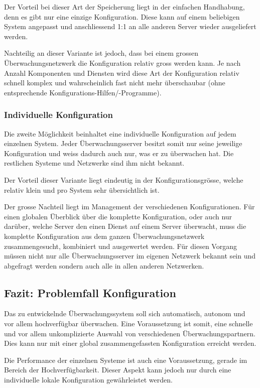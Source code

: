 Der Vorteil bei dieser Art der Speicherung liegt in der einfachen Handhabung, denn es gibt nur eine einzige Konfiguration. Diese kann auf einem beliebigen System angepasst und anschliessend 1:1 an alle anderen Server wieder ausgeliefert werden.

Nachteilig an dieser Variante ist jedoch, dass bei einem grossen \"Uberwachungsnetzwerk die Konfiguration relativ gross werden kann. Je nach Anzahl Komponenten und Diensten wird diese Art der Konfiguration relativ schnell komplex und wahrscheinlich fast nicht mehr \"uberschaubar (ohne entsprechende Konfigurations-Hilfen/-Programme).

\subsubsection{Individuelle Konfiguration} \label{sec:theorie-config-variants-individual}
Die zweite M\"oglichkeit beinhaltet eine individuelle Konfiguration auf jedem einzelnen System. Jeder \"Uberwachungsserver besitzt somit nur seine jeweilige Konfiguration und weiss dadurch auch nur, was er zu \"uberwachen hat. Die restlichen Systeme und Netzwerke sind ihm nicht bekannt.

Der Vorteil dieser Variante liegt eindeutig in der Konfigurationsgr\"osse, welche relativ klein und pro System sehr \"ubersichtlich ist.

Der grosse Nachteil liegt im Management der verschiedenen Konfigurationen. F\"ur einen globalen \"Uberblick \"uber die komplette Konfiguration, oder auch nur dar\"uber, welche Server den einen Dienst auf einem Server \"uberwacht, muss die komplette Konfiguration aus dem ganzen \"Uberwachungsnetzwerk zusammengesucht, kombiniert und ausgewertet werden. F\"ur diesen Vorgang m\"ussen nicht nur alle \"Uberwachungsserver im eigenen Netzwerk bekannt sein und abgefragt werden sondern auch alle in allen anderen Netzwerken.

\subsection{Fazit: Problemfall Konfiguration} \label{sec:theorie-config-fazit}
Das zu entwickelnde \"Uberwachungssystem soll sich automatisch, autonom und vor allem hochverf\"ugbar \"uberwachen. Eine Voraussetzung ist somit, eine schnelle und vor allem unkomplizierte Auswahl von verschiedenen \"Uberwachungspartnern. Dies kann nur mit einer global zusammengefassten Konfiguration erreicht werden.

Die Performance der einzelnen Systeme ist auch eine Voraussetzung, gerade im Bereich der Hochverf\"ugbarkeit. Dieser Aspekt kann jedoch nur durch eine individuelle lokale Konfiguration gew\"ahrleistet werden.

